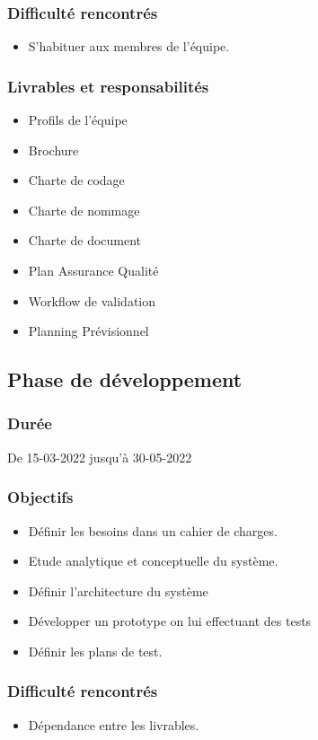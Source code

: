\documentclass[11pt,fleqn]{book} %
\begin{document}
\subsubsection{Difficulté rencontrés}
\begin{itemize}
    \item  S’habituer aux membres de l’équipe.
\end{itemize}
\subsubsection{Livrables et responsabilités }
\begin{itemize}
    \item Profils de l’équipe
    \item Brochure
    \item Charte de codage
    \item Charte de nommage
    \item Charte de document
    \item Plan Assurance Qualité
    \item Workflow de validation
    \item Planning Prévisionnel
\end{itemize}

\subsection{Phase de développement}
\subsubsection{Durée}
De 15-03-2022 jusqu’à 30-05-2022
\subsubsection{Objectifs}
\begin{itemize}
    \item Définir les besoins dans un cahier de charges.
    \item Etude analytique et conceptuelle du système.
    \item Définir l’architecture du système
    \item Développer un prototype on lui effectuant des tests
    \item  Définir les plans de test. 
\end{itemize}
\subsubsection{Difficulté rencontrés}
\begin{itemize}
    \item  Dépendance entre les livrables. 
\end{itemize}
\end{document}
